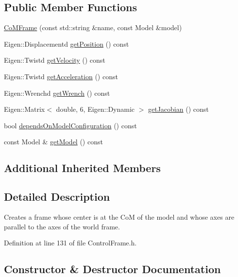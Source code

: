 \subsection*{Public Member Functions}
\begin{DoxyCompactItemize}
\item 
\hyperlink{classocra_1_1CoMFrame_a0b9177034d13b851238da7edfadcdf38}{Co\+M\+Frame} (const std\+::string \&name, const Model \&model)
\item 
Eigen\+::\+Displacementd \hyperlink{classocra_1_1CoMFrame_a809c05664b2e2abb489e930e27fbe2d4}{get\+Position} () const
\item 
Eigen\+::\+Twistd \hyperlink{classocra_1_1CoMFrame_a02be3e73c64903d67b1e7ada25c468c5}{get\+Velocity} () const
\item 
Eigen\+::\+Twistd \hyperlink{classocra_1_1CoMFrame_a9e59ca65720c553da5c75f484544829c}{get\+Acceleration} () const
\item 
Eigen\+::\+Wrenchd \hyperlink{classocra_1_1CoMFrame_a8e00462bbe13df6f595b7000d44240c6}{get\+Wrench} () const
\item 
Eigen\+::\+Matrix$<$ double, 6, Eigen\+::\+Dynamic $>$ \hyperlink{classocra_1_1CoMFrame_ab24f3400af3e8eb2a12d6597ff8a7a31}{get\+Jacobian} () const
\item 
bool \hyperlink{classocra_1_1CoMFrame_aaae3fd05da2f9e301dbe1c54b57fe624}{depends\+On\+Model\+Configuration} () const
\item 
const Model \& \hyperlink{classocra_1_1CoMFrame_afc280df9814e7eb2cf62f017f7bbfc2e}{get\+Model} () const
\end{DoxyCompactItemize}
\subsection*{Additional Inherited Members}


\subsection{Detailed Description}
Creates a frame whose center is at the CoM of the model and whose axes are parallel to the axes of the world frame. 

Definition at line 131 of file Control\+Frame.\+h.



\subsection{Constructor \& Destructor Documentation}
\hypertarget{classocra_1_1CoMFrame_a0b9177034d13b851238da7edfadcdf38}{}\label{classocra_1_1CoMFrame_a0b9177034d13b851238da7edfadcdf38} 
